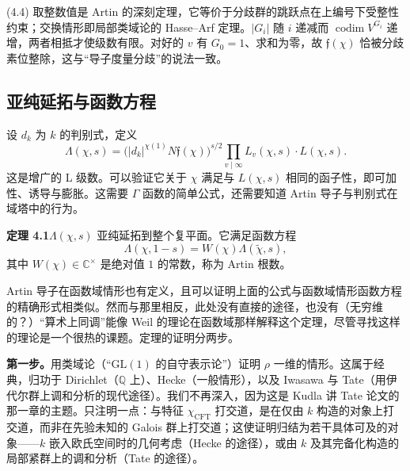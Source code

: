 \begin{annote}
(4.4) 取整数值是 Artin 的深刻定理，它等价于分歧群的跳跃点在上编号下受整性约束；交换情形即局部类域论的 Hasse--Arf 定理。$|G_i|$ 随 $i$ 递减而 $\operatorname{codim}V^{G_i}$ 递增，两者相抵才使级数有限。对好的 $v$ 有 $G_0=1$、求和为零，故 $\mathfrak{f}(\chi)$ 恰被分歧素位整除，这与“导子度量分歧”的说法一致。
\par\vspace{0.15em}{\raggedleft 【来源：Serre《Local Fields》Ch.~VI（A）；Tate《Local constants》，Durham 会议录（A）】\par}
\end{annote}

\subsection{亚纯延拓与函数方程}\label{c4:sec:4.3}

设 $d_k$ 为 $k$ 的判别式，定义
\begin{equation}\tag{4.6}\label{c4:eq:4.6}
\Lambda(\chi,s)=\bigl(|d_k|^{\chi(1)}N\mathfrak{f}(\chi)\bigr)^{s/2}\prod_{v\mid\infty}L_v(\chi,s)\cdot L(\chi,s).
\end{equation}
这是增广的 L 级数。可以验证它关于 $\chi$ 满足与 $L(\chi,s)$ 相同的函子性，即可加性、诱导与膨胀。这需要 $\Gamma$ 函数的简单公式，还需要知道 Artin 导子与判别式在域塔中的行为。

\par\medskip\noindent\textbf{定理 4.1}\quad $\Lambda(\chi,s)$ 亚纯延拓到整个复平面。它满足函数方程
\begin{equation}\tag{4.7}\label{c4:eq:4.7}
\Lambda(\chi,1-s)=W(\chi)\Lambda(\tilde\chi,s),
\end{equation}
其中 $W(\chi)\in\mathbb{C}^{\times}$ 是绝对值 $1$ 的常数，称为 Artin 根数。

Artin 导子在函数域情形也有定义，且可以证明上面的公式与函数域情形函数方程的精确形式相类似。然而与那里相反，此处没有直接的途径，也没有（无穷维的？）“算术上同调”能像 Weil 的理论在函数域那样解释这个定理，尽管寻找这样的理论是一个很热的课题。定理的证明分两步。

\textbf{第一步。}用类域论（“$\mathrm{GL}(1)$ 的自守表示论”）证明 $\rho$ 一维的情形。这属于经典，归功于 Dirichlet（$\mathbb{Q}$ 上）、Hecke（一般情形），以及 Iwasawa 与 Tate（用伊代尔群上调和分析的现代途径）。我们不再深入，因为这是 Kudla 讲 Tate 论文的那一章的主题。只注明一点：与特征 $\chi_{\mathrm{CFT}}$ 打交道，是在仅由 $k$ 构造的对象上打交道，而非在先验未知的 Galois 群上打交道；这使证明归结为若干具体可及的对象——$k$ 嵌入欧氏空间时的几何考虑（Hecke 的途径），或由 $k$ 及其完备化构造的局部紧群上的调和分析（Tate 的途径）。

